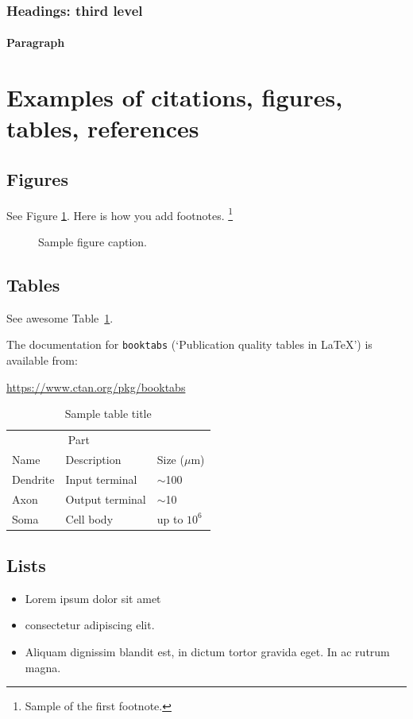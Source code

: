 \documentclass{article}
\begin{document}
\subsubsection{Headings: third level}
\lipsum[6]

\paragraph{Paragraph}
\lipsum[7]



\section{Examples of citations, figures, tables, references}
\label{sec:others}

\subsection{Figures}
\lipsum[10]
See Figure \ref{fig:fig1}. Here is how you add footnotes. \footnote{Sample of the first footnote.}
\lipsum[11]

\begin{figure}
	\centering
	\fbox{\rule[-.5cm]{4cm}{4cm} \rule[-.5cm]{4cm}{0cm}}
	\caption{Sample figure caption.}
	\label{fig:fig1}
\end{figure}

\subsection{Tables}
See awesome Table~\ref{tab:table}.

The documentation for \verb+booktabs+ (`Publication quality tables in LaTeX') is available from:
\begin{center}
	\url{https://www.ctan.org/pkg/booktabs}
\end{center}


\begin{table}
	\caption{Sample table title}
	\centering
	\begin{tabular}{lll}
		\toprule
		\multicolumn{2}{c}{Part}                   \\
		\cmidrule(r){1-2}
		Name     & Description     & Size ($\mu$m) \\
		\midrule
		Dendrite & Input terminal  & $\sim$100     \\
		Axon     & Output terminal & $\sim$10      \\
		Soma     & Cell body       & up to $10^6$  \\
		\bottomrule
	\end{tabular}
	\label{tab:table}
\end{table}

\subsection{Lists}
\begin{itemize}
	\item Lorem ipsum dolor sit amet
	\item consectetur adipiscing elit.
	\item Aliquam dignissim blandit est, in dictum tortor gravida eget. In ac rutrum magna.
\end{itemize}

\printbibliography
\printglossaries
\end{document}
